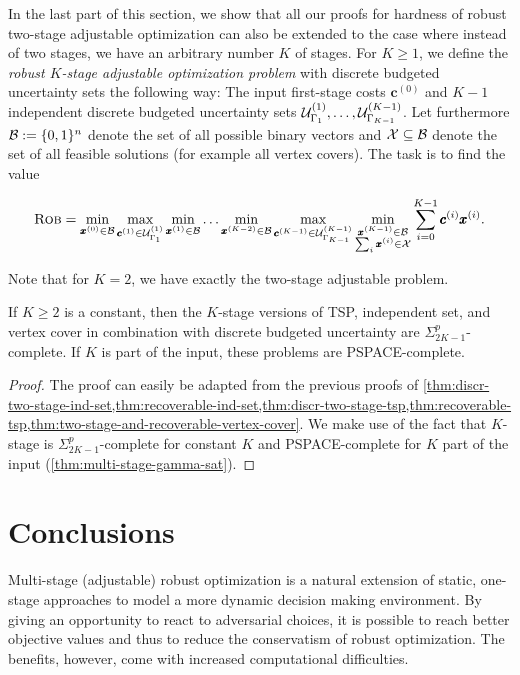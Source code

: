 In the last part of this section, we show that all our proofs for hardness of robust two-stage adjustable optimization can also be extended to the case where instead of two stages, we have an arbitrary number $K$ of stages. For $K \geq 1$, we define the \emph{robust $K$-stage adjustable optimization problem} with discrete budgeted uncertainty sets the following way: The input  first-stage costs $\pmb c^{(0)}$ and $K-1$ independent discrete budgeted uncertainty sets $\mathcal{U}^{(1)}_{\Gamma_1},\dots,\mathcal{U}^{(K-1)}_{\Gamma_{K-1}}$. Let furthermore ${\mathcal{B}} := \{ 0,1 \}^n$ denote the set of all possible binary vectors and $\mathcal{X} \subseteq {\mathcal{B}}$ denote the set of all feasible solutions (for example all vertex covers).
The task is to find the value

\begin{equation*}
\textsc{Rob} = \min_{\pmb x^{(0)} \in {\mathcal{B}}} \max_{\pmb c^{(1)} \in \mathcal{U}^{(1)}_{\Gamma_1} } \min_{\pmb x^{(1)} \in {\mathcal{B}}} \dots \min_{\pmb x^{(K-2)} \in {\mathcal{B}}} \max_{\pmb c^{(K-1)} \in \mathcal{U}^{(K-1)}_{\Gamma_{K-1}}} \min_{\substack{\pmb x^{(K-1)} \in {\mathcal{B}}\\ \sum_i \pmb x^{(i)} \in \mathcal{X}}} \sum_{i=0}^{K-1} \pmb c^{(i)}\pmb x^{(i)}.
\end{equation*} 

Note that for $K=2$, we have exactly the two-stage adjustable problem. 
\begin{theorem}
If $K \geq 2$ is a constant, then the $K$-stage versions of TSP, independent set, and vertex cover in combination with discrete budgeted uncertainty are $\Sigma_{2K-1}^p$-complete. If $K$ is part of the input, these problems are PSPACE-complete.
\end{theorem}
\begin{proof}
The proof can easily be adapted from the previous proofs of \cref{thm:discr-two-stage-ind-set,thm:recoverable-ind-set,thm:discr-two-stage-tsp,thm:recoverable-tsp,thm:two-stage-and-recoverable-vertex-cover}.
We make use of the fact that $K$-stage {\radj} is $\Sigma_{2K-1}^p$-complete for constant $K$ and PSPACE-complete for $K$ part of the input (\cref{thm:multi-stage-gamma-sat}). 
\end{proof}




\section{Conclusions}
\label{sec:conclusions-chapter-2}

Multi-stage (adjustable) robust optimization is a natural extension of static, one-stage approaches to model a more dynamic decision making environment. By giving an opportunity to react to adversarial choices, it is possible to reach better objective values and thus to reduce the conservatism of robust optimization. The benefits, however, come with increased computational difficulties.

